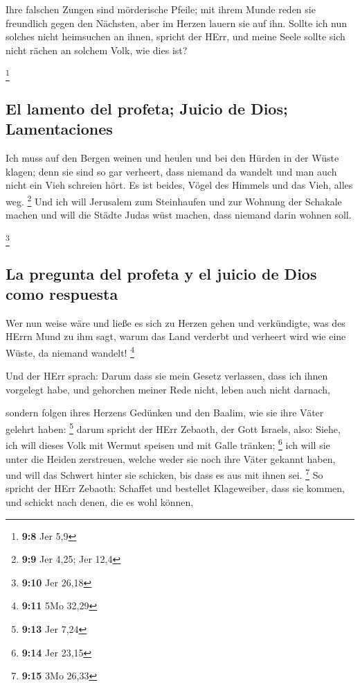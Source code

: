  Ihre falschen Zungen sind mörderische Pfeile; mit ihrem
Munde reden sie freundlich gegen den Nächsten, aber im Herzen lauern sie
auf ihn.  Sollte ich nun solches nicht heimsuchen an
ihnen, spricht der HErr, und meine Seele sollte sich nicht rächen an
solchem Volk, wie dies ist?

\footnote{\textbf{9:8} Jer 5,9}

\hypertarget{el-lamento-del-profeta-juicio-de-dios-lamentaciones}{%
\subsection{El lamento del profeta; Juicio de Dios;
Lamentaciones}\label{el-lamento-del-profeta-juicio-de-dios-lamentaciones}}

 Ich muss auf den Bergen weinen und heulen und bei den
Hürden in der Wüste klagen; denn sie sind so gar verheert, dass niemand
da wandelt und man auch nicht ein Vieh schreien hört. Es ist beides,
Vögel des Himmels und das Vieh, alles weg. \footnote{\textbf{9:9} Jer
  4,25; Jer 12,4}  Und ich will Jerusalem zum Steinhaufen
und zur Wohnung der Schakale machen und will die Städte Judas wüst
machen, dass niemand darin wohnen soll.

\footnote{\textbf{9:10} Jer 26,18}

\hypertarget{la-pregunta-del-profeta-y-el-juicio-de-dios-como-respuesta}{%
\subsection{La pregunta del profeta y el juicio de Dios como
respuesta}\label{la-pregunta-del-profeta-y-el-juicio-de-dios-como-respuesta}}

 Wer nun weise wäre und ließe es sich zu Herzen gehen und
verkündigte, was des HErrn Mund zu ihm sagt, warum das Land verderbt und
verheert wird wie eine Wüste, da niemand wandelt! \footnote{\textbf{9:11}
  5Mo 32,29}

 Und der HErr sprach: Darum dass sie mein Gesetz
verlassen, dass ich ihnen vorgelegt habe, und gehorchen meiner Rede
nicht, leben auch nicht darnach,

 sondern folgen ihres Herzens Gedünken und den Baalim,
wie sie ihre Väter gelehrt haben: \footnote{\textbf{9:13} Jer 7,24}
 darum spricht der HErr Zebaoth, der Gott Israels, also:
Siehe, ich will dieses Volk mit Wermut speisen und mit Galle tränken;
\footnote{\textbf{9:14} Jer 23,15}  ich will sie unter
die Heiden zerstreuen, welche weder sie noch ihre Väter gekannt haben,
und will das Schwert hinter sie schicken, bis dass es aus mit ihnen sei.
\footnote{\textbf{9:15} 3Mo 26,33}  So spricht der HErr
Zebaoth: Schaffet und bestellet Klageweiber, dass sie kommen, und
schickt nach denen, die es wohl können,

